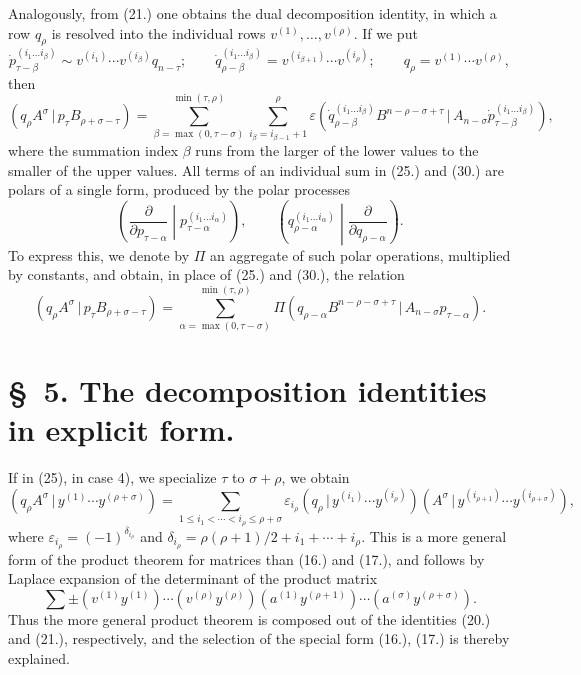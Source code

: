 \documentclass[11pt]{article}
\providecommand{\pair}[2]{(#1\,|\,#2)}
\providecommand{\eps}{\varepsilon}
\begin{document}
Analogously, from (21.) one obtains the dual decomposition identity, in which a row $q_\rho$ is resolved into the individual rows $v^{(1)},\ldots,v^{(\rho)}$. If we put
\begin{equation}
 \dot p_{\tau-\beta}^{(i_1\ldots i_\beta)}\sim v^{(i_1)}\cdots v^{(i_\beta)}q_{n-\tau};\qquad
 \dot q_{\rho-\beta}^{(i_1\ldots i_\beta)}=v^{(i_{\beta+1})}\cdots v^{(i_\rho)};\qquad
 q_\rho=v^{(1)}\cdots v^{(\rho)},
\tag{29}
\end{equation}
then
\begin{equation}
 \pair{q_\rho A^\sigma}{p_\tau B_{\rho+\sigma-\tau}}
 =\sum_{\beta=\max(0,\tau-\sigma)}^{\min(\tau,\rho)}
   \sum_{i_\beta=i_{\beta-1}+1}^{\rho}\eps
\pair{\dot q_{\rho-\beta}^{(i_1\ldots i_\beta)}B^{n-\rho-\sigma+\tau}}{A_{n-\sigma}\dot p_{\tau-\beta}^{(i_1\ldots i_\beta)}} ,
\tag{30}
\end{equation}
where the summation index $\beta$ runs from the larger of the lower values to the smaller of the upper values. All terms of an individual sum in (25.) and (30.) are polars of a single form, produced by the polar processes
\[
\left(\frac{\partial}{\partial p_{\tau-\alpha}}\middle|p_{\tau-\alpha}^{(i_1\ldots i_\alpha)}\right),\qquad
\left(q_{\rho-\alpha}^{(i_1\ldots i_\alpha)}\middle|\frac{\partial}{\partial q_{\rho-\alpha}}\right).
\]
To express this, we denote by $\Pi$ an aggregate of such polar operations, multiplied by constants, and obtain, in place of (25.) and (30.), the relation
\begin{equation}
 \pair{q_\rho A^\sigma}{p_\tau B_{\rho+\sigma-\tau}}
 =\sum_{\alpha=\max(0,\tau-\sigma)}^{\min(\tau,\rho)}
 \Pi\pair{q_{\rho-\alpha}B^{n-\rho-\sigma+\tau}}{A_{n-\sigma}p_{\tau-\alpha}}.
\tag{31}
\end{equation}

\section*{\S\ 5. The decomposition identities in explicit form.}
If in (25), in case 4), we specialize $\tau$ to $\sigma+\rho$, we obtain
\begin{equation}
 \pair{q_\rho A^\sigma}{y^{(1)}\cdots y^{(\rho+\sigma)}}
 =\sum_{1\le i_1<\cdots<i_\rho\le \rho+\sigma}
 \eps_{i_\rho}\pair{q_\rho}{y^{(i_1)}\cdots y^{(i_\rho)}}
 \pair{A^\sigma}{y^{(i_{\rho+1})}\cdots y^{(i_{\rho+\sigma})}},
\tag{32}
\end{equation}
where $\eps_{i_\rho}=(-1)^{\delta_{i_\rho}}$ and $\delta_{i_\rho}=\rho(\rho+1)/2+i_1+\cdots+i_\rho$. This is a more general form of the product theorem for matrices than (16.) and (17.), and follows by Laplace expansion of the determinant of the product matrix
\[
 \sum\pm(v^{(1)}y^{(1)})\cdots(v^{(\rho)}y^{(\rho)})(a^{(1)}y^{(\rho+1)})\cdots(a^{(\sigma)}y^{(\rho+\sigma)}).
\]
Thus the more general product theorem is composed out of the identities (20.) and (21.), respectively, and the selection of the special form (16.), (17.) is thereby explained.
\end{document}
